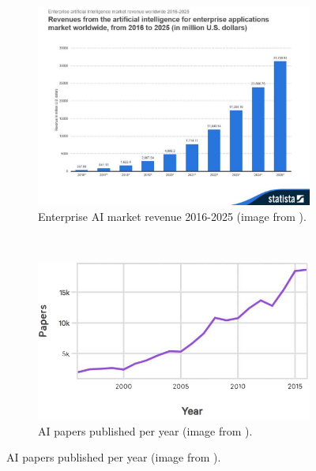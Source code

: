 \begin{figure}[!ht]
   \centering
   \begin{subfigure}[b]{0.5\textwidth}
       \includegraphics[width=\textwidth]{figures/ai-projections.jpg}
       \caption{Enterprise AI market revenue 2016-2025 (image from \cite{ai-proj}).}
       \label{fig:ai-proj}
   \end{subfigure}%
   ~
   \begin{subfigure}[b]{0.5\textwidth}
       \includegraphics[width=\textwidth]{figures/ai-papers.png}
       \caption{AI papers published per year (image from \cite{ai-papers}).}
       \label{fig:ai-papers}
   \end{subfigure}
\end{figure}

